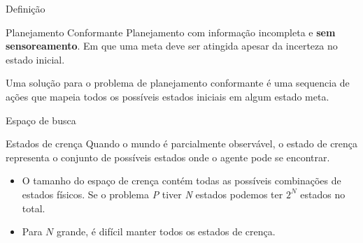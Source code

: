 \begin{frame}{Definição}
\begin{block}{Planejamento Conformante}
{ \small Planejamento com informação incompleta e \textbf{sem sensoreamento}. Em 
que uma meta deve ser atingida apesar da incerteza no estado inicial.}
\end{block}

Uma solução para o problema de planejamento conformante é uma sequencia de ações 
que mapeia todos os possíveis estados iniciais em algum estado meta. \\

\end{frame}

\begin{frame}{Espaço de busca}
    \begin{block}{Estados de crença}
    { \small Quando o mundo é parcialmente observável, o estado de crença 
representa o conjunto de possíveis estados onde o agente pode se encontrar. } \\
    \end{block}
    \begin{itemize}
    \item O tamanho do espaço de crença contém todas as possíveis combinações de 
estados físicos.
    Se o problema \textit{P} tiver \textit{N} estados podemos ter 
$2^{\textit{N}}$ estados no total.\\
    \item Para $N$ grande, é difícil manter todos os estados de crença.
\end{itemize}
\end{frame}

